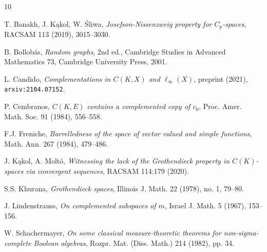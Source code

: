 \documentclass[11pt]{amsart}
\newtheorem{corollary}[theorem]{Corollary}
\theoremstyle{definition}
\theoremstyle{remark}
\numberwithin{equation}{section}
\begin{document}



\begin{thebibliography}{10}


 T. Banakh, J. K\k{a}kol, W. \'Sliwa, {\em Josefson-Nissenzweig property for $C_{p}$-spaces}, RACSAM 113 (2019), 3015--3030.

 B. Bollob\'as, {\em Random graphs}, 2nd ed., Cambridge Studies in Advanced Mathematics 73, Cambridge University Press, 2001.

 L. Candido, {\em Complementations in $C(K,X)$ and $\ell_\infty(X)$}, preprint (2021), \texttt{arxiv:2104.07152}.

 P. Cembranos, {\em $C(K, E)$ contains a complemented copy of $c_0$}, Proc. Amer. Math. Soc. 91 (1984), 556--558.

 F.J. Freniche, {\em Barrelledness of the space of vector valued and simple functions}, Math. Ann. 267 (1984), 479--486.



 J. K\k{a}kol, A. Molt\'o, {\em Witnessing the lack of the Grothendieck property in $C(K)$-spaces via convergent sequences}, RACSAM 114:179 (2020).

 S.S. Khurana, {\em Grothendieck spaces}, Illinois J. Math. 22 (1978), no. 1, 79--80.

 J. Lindenstrauss, {\em On complemented subspaces of $m$}, Israel J. Math. 5 (1967), 153--156.


 W. Schachermayer, {\em On some classical measure-theoretic theorems for non-sigma-complete Boolean algebras}, Rozpr. Mat. (Diss. Math.) 214 (1982), pp. 34.

\end{thebibliography}
\end{document}
